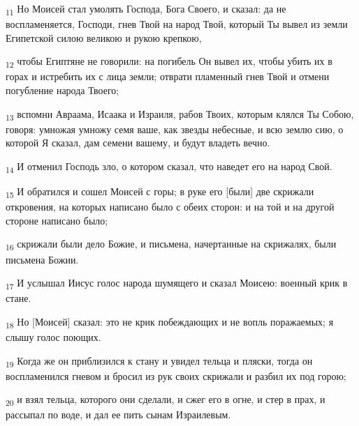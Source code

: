 \begin{tcolorbox}
\textsubscript{11} Но Моисей стал умолять Господа, Бога Своего, и сказал: да не воспламеняется, Господи, гнев Твой на народ Твой, который Ты вывел из земли Египетской силою великою и рукою крепкою,
\end{tcolorbox}
\begin{tcolorbox}
\textsubscript{12} чтобы Египтяне не говорили: на погибель Он вывел их, чтобы убить их в горах и истребить их с лица земли; отврати пламенный гнев Твой и отмени погубление народа Твоего;
\end{tcolorbox}
\begin{tcolorbox}
\textsubscript{13} вспомни Авраама, Исаака и Израиля, рабов Твоих, которым клялся Ты Собою, говоря: умножая умножу семя ваше, как звезды небесные, и всю землю сию, о которой Я сказал, дам семени вашему, и будут владеть вечно.
\end{tcolorbox}
\begin{tcolorbox}
\textsubscript{14} И отменил Господь зло, о котором сказал, что наведет его на народ Свой.
\end{tcolorbox}
\begin{tcolorbox}
\textsubscript{15} И обратился и сошел Моисей с горы; в руке его [были] две скрижали откровения, на которых написано было с обеих сторон: и на той и на другой стороне написано было;
\end{tcolorbox}
\begin{tcolorbox}
\textsubscript{16} скрижали были дело Божие, и письмена, начертанные на скрижалях, были письмена Божии.
\end{tcolorbox}
\begin{tcolorbox}
\textsubscript{17} И услышал Иисус голос народа шумящего и сказал Моисею: военный крик в стане.
\end{tcolorbox}
\begin{tcolorbox}
\textsubscript{18} Но [Моисей] сказал: это не крик побеждающих и не вопль поражаемых; я слышу голос поющих.
\end{tcolorbox}
\begin{tcolorbox}
\textsubscript{19} Когда же он приблизился к стану и увидел тельца и пляски, тогда он воспламенился гневом и бросил из рук своих скрижали и разбил их под горою;
\end{tcolorbox}
\begin{tcolorbox}
\textsubscript{20} и взял тельца, которого они сделали, и сжег его в огне, и стер в прах, и рассыпал по воде, и дал ее пить сынам Израилевым.
\end{tcolorbox}
